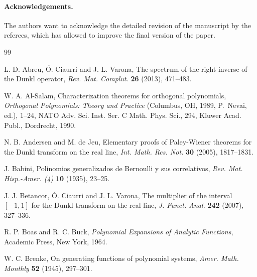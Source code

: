 \documentclass[11pt]{article}
\theoremstyle{plain}
\theoremstyle{remark}
\numberwithin{equation}{section} %
\begin{document}
\paragraph*{Acknowledgements.}
The authors want to acknowledge the detailed revision of the manuscript by the referees, which has allowed to improve the final version of the paper.

\begin{thebibliography}{99}


L. D. Abreu, \'O. Ciaurri and J. L. Varona, 
The spectrum of the right inverse of the Dunkl operator, 
\textit{Rev. Mat. Complut.} \textbf{26} (2013), 471--483. %

W. A. Al-Salam,
Characterization theorems for orthogonal polynomials,
\textit{Orthogonal Polynomials: Theory and Practice}
(Columbus, OH, 1989, P.~Nevai, ed.), 1--24,
NATO Adv. Sci. Inst. Ser. C Math. Phys. Sci., 294,
Kluwer Acad. Publ., Dordrecht, 1990.

N. B. Andersen and M. de Jeu,
{Elementary proofs of Paley-Wiener theorems
for the Dunkl transform on the real line},
\textit{Int. Math. Res. Not.}
\textbf{30} (2005), 1817--1831.



{J. Babini},
Polinomios generalizados de Bernoulli y sus correlativos,
\textit{Rev. Mat. Hisp.-Amer. (4)}
\textbf{10} (1935), 23--25.

J. J. Betancor, \'O. Ciaurri and J. L. Varona,
{The multiplier of the interval $[-1,1]$ for the Dunkl transform on the real line},
\textit{J. Funct. Anal.}
\textbf{242} (2007), 327--336.

R. P. Boas and R. C. Buck, 
\textit{Polynomial Expansions of Analytic Functions}, 
Academic Press, New York, 1964.


W. C. Brenke, 
On generating functions of polynomial systems, 
\textit{Amer. Math. Monthly} \textbf{52} (1945), 297--301.


\end{thebibliography}
\end{document}
